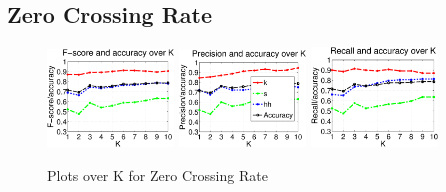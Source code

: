 	
	\subsection{Zero Crossing Rate}
		\begin{figure}
			\centering\includegraphics[width=0.3\textwidth]{tex/appendices/test/zcr11FP.png}
			\centering\includegraphics[width=0.3\textwidth]{tex/appendices/test/zcr11_P.png}
			\centering\includegraphics[width=0.3\textwidth]{tex/appendices/test/zcr11_R.png}
			\label{fig:eval:zcr}
			\caption{Plots over K for Zero Crossing Rate}
		\end{figure}
		

